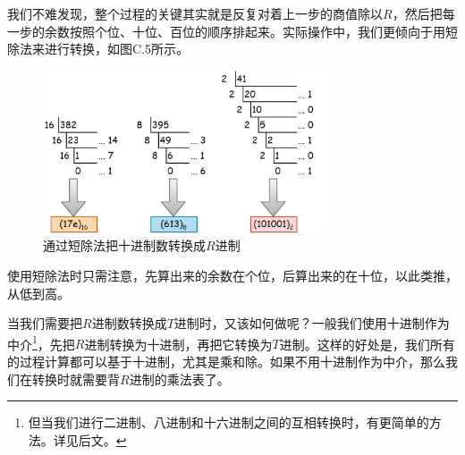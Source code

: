 我们不难发现，整个过程的关键其实就是反复对着上一步的商值除以$R$，然后把每一步的余数按照个位、十位、百位的顺序排起来。实际操作中，我们更倾向于用短除法来进行转换，如图C.5所示。\par
\begin{figure}[htbp]
    \centering
    \includegraphics[width=0.75\textwidth]{../images/other_parts/C_short_division_300.png}
    \caption{通过短除法把十进制数转换成$R$进制}
\end{figure}
使用短除法时只需注意，先算出来的余数在个位，后算出来的在十位，以此类推，从低到高。\par
当我们需要把$R$进制数转换成$T$进制时，又该如何做呢？一般我们使用十进制作为中介\footnote{但当我们进行二进制、八进制和十六进制之间的互相转换时，有更简单的方法。详见后文。}，先把$R$进制转换为十进制，再把它转换为$T$进制。这样的好处是，我们所有的过程计算都可以基于十进制，尤其是乘和除。如果不用十进制作为中介，那么我们在转换时就需要背$R$进制的乘法表了。\par
